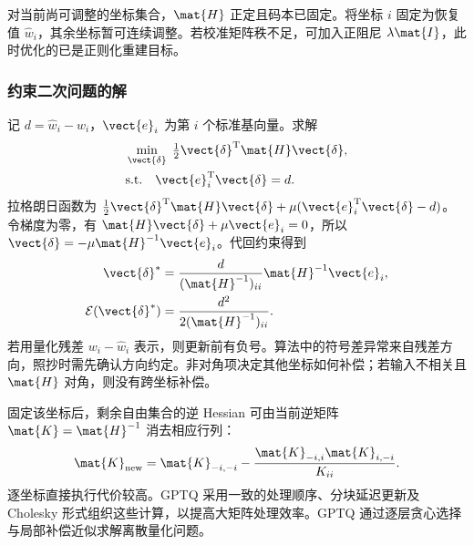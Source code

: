 \documentclass[../textbook.tex]{subfiles}
\begin{document}
\begin{assumption}[单坐标量化补偿]
对当前尚可调整的坐标集合，$\mat{H}$ 正定且码本已固定。将坐标 $i$ 固定为恢复值 $\widehat w_i$，其余坐标暂可连续调整。若校准矩阵秩不足，可加入正阻尼 $\lambda \mat{I}$，此时优化的已是正则化重建目标。
\end{assumption}

\subsubsection{约束二次问题的解}
记 $d=\widehat w_i-w_i$，$\vect{e}_i$ 为第 $i$ 个标准基向量。求解
\begin{equation}
\begin{aligned}
 &\min_{\vect{\delta}}\;\tfrac12\vect{\delta}^{\mathrm{T}}\mat{H}\vect{\delta}, \\
 &\text{s.t.}\quad \vect{e}_i^{\mathrm{T}}\vect{\delta}=d.
\end{aligned}
\end{equation}
拉格朗日函数为 $\tfrac12\vect{\delta}^{\mathrm{T}}\mat{H}\vect{\delta}+\mu(\vect{e}_i^{\mathrm{T}}\vect{\delta}-d)$。令梯度为零，有 $\mat{H}\vect{\delta}+\mu \vect{e}_i=0$，所以 $\vect{\delta}=-\mu \mat{H}^{-1}\vect{e}_i$。代回约束得到
\begin{equation}\label{eq:opt-gptqcomp}
\begin{aligned}
 \vect{\delta}^* &= \frac{d}{(\mat{H}^{-1})_{ii}}\mat{H}^{-1}\vect{e}_i, \\
 \mathcal E(\vect{\delta}^*) &= \frac{d^2}{2(\mat{H}^{-1})_{ii}}.
\end{aligned}
\end{equation}
若用量化残差 $w_i-\widehat w_i$ 表示，则更新前有负号。算法中的符号差异常来自残差方向，照抄时需先确认方向约定。非对角项决定其他坐标如何补偿；若输入不相关且 $\mat{H}$ 对角，则没有跨坐标补偿。

固定该坐标后，剩余自由集合的逆 Hessian 可由当前逆矩阵 $\mat{K}=\mat{H}^{-1}$ 消去相应行列：
\begin{equation}
\mat{K}_{\mathrm{new}}=\mat{K}_{-i,-i}-\frac{\mat{K}_{-i,i}\mat{K}_{i,-i}}{K_{ii}}.
\end{equation}
逐坐标直接执行代价较高。GPTQ 采用一致的处理顺序、分块延迟更新及 Cholesky 形式组织这些计算，以提高大矩阵处理效率\cite{frantar2023gptq}。GPTQ 通过逐层贪心选择与局部补偿近似求解离散量化问题。
\end{document}
